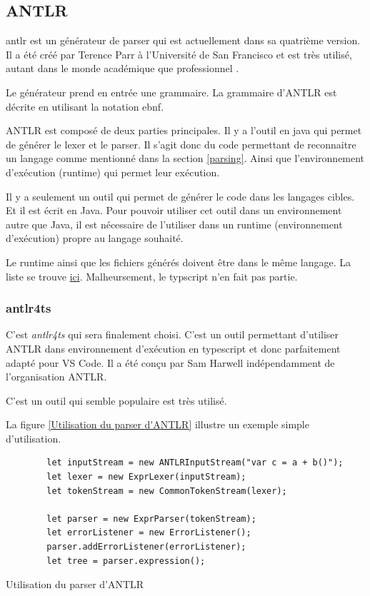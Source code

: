\documentclass[
    iict, %
    il, %
]{heig-tb}
\begin{document}
\subsection{ANTLR}

\Gls{antlr} est un générateur de parser qui est actuellement dans sa quatrième version.
Il a été créé par Terence Parr à l'Université de San Francisco et est très utilisé, autant dans le monde académique que professionnel \cite{antlr}.

Le générateur prend en entrée une grammaire. La grammaire d'ANTLR est décrite en utilisant la notation \Gls{ebnf}.

ANTLR est composé de deux parties principales. Il y a l'outil en java qui permet de générer le lexer et le parser. Il s'agit donc du code permettant de reconnaitre un langage comme mentionné dans la section \ref{parsing}.
Ainsi que l'environnement d'exécution (runtime) qui permet leur exécution.

Il y a seulement un outil qui permet de générer le code dans les langages cibles. Et il est écrit en Java.
Pour pouvoir utiliser cet outil dans un environnement autre que Java, il est nécessaire de l'utiliser dans un runtime (environnement d'exécution) propre au langage souhaité.

Le runtime ainsi que les fichiers générés doivent être dans le même langage. La liste se trouve \href{https://github.com/antlr/antlr4/blob/master/doc/targets.md}{ici}.
Malheursement, le typscript n'en fait pas partie.

\subsubsection{antlr4ts}
C'est \emph{antlr4ts} qui sera finalement choisi. C'est un outil permettant d'utiliser ANTLR dans environnement d'exécution en typescript et donc parfaitement adapté pour VS Code.
Il a été conçu par Sam Harwell indépendamment de l'organisation ANTLR.


C'est un outil qui semble populaire est très utilisé.

La figure \ref{Utilisation du parser d'ANTLR} illustre un exemple simple d'utilisation.

\begin{listing}[!ht]
    \begin{verbatim}
        let inputStream = new ANTLRInputStream("var c = a + b()");
        let lexer = new ExprLexer(inputStream);
        let tokenStream = new CommonTokenStream(lexer);

        let parser = new ExprParser(tokenStream);
        let errorListener = new ErrorListener();
        parser.addErrorListener(errorListener);
        let tree = parser.expression();
    \end{verbatim}
    \caption{Utilisation du parser d'ANTLR}
    \label{Utilisation du parser d'ANTLR}
\end{listing}
\end{document}
